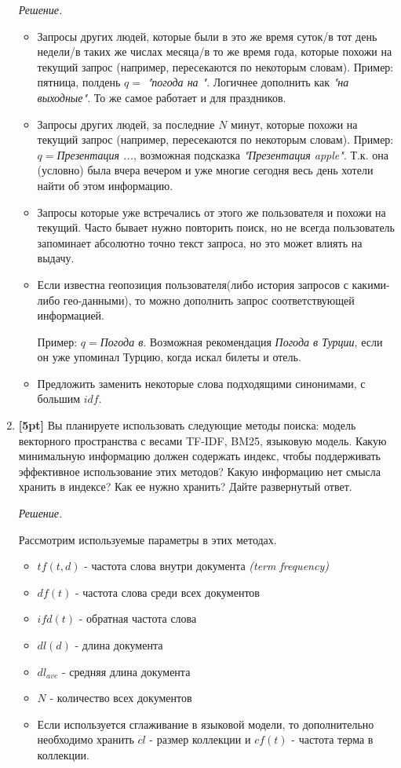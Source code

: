 \begin{enumerate}
	\textit{Решение.} 
	\begin{itemize}
		\item Запросы других людей, которые были в это же время суток/в тот день недели/в таких 
		же числах месяца/в то же время года, которые похожи на текущий запрос (например, 
		пересекаются по некоторым словам). Пример: пятница, полдень $q=$ \textit{"погода на "}. 
		Логичнее дополнить как \textit{"на выходные"}. То же самое работает и для праздников.
		\item Запросы других людей, за последние $N$ минут, которые похожи на текущий запрос 
		(например, пересекаются по некоторым словам). Пример: $q=$\textit{Презентация ...}, 
		возможная подсказка \textit{"Презентация apple"}. Т.к. она (условно) была вчера вечером и 
		уже многие сегодня весь день хотели найти об этом информацию.
		\item Запросы которые уже встречались от этого же пользователя и похожи на текущий. Часто 
		бывает нужно повторить поиск, но не всегда пользователь запоминает абсолютно точно текст 
		запроса, но это может влиять на выдачу.
		\item Если известна геопозиция пользователя(либо история запросов с какими-либо 
		гео-данными), то можно дополнить запрос соответствующей информацией.
		
		Пример: $q=$\textit{Погода в}. Возможная рекомендация \textit{Погода в Турции}, если он уже 
		упоминал Турцию, когда искал билеты и отель.
		\item Предложить заменить некоторые слова подходящими синонимами, с большим $idf$.
	\end{itemize}
	\item \textbf{[5pt]} Вы планируете использовать следующие методы поиска: модель векторного 
	пространства с весами TF-IDF, BM25, языковую модель. Какую минимальную информацию должен 
	содержать индекс, чтобы поддерживать эффективное использование этих методов? Какую информацию 
	нет смысла хранить в индексе? Как ее нужно хранить? Дайте развернутый ответ.
	
	\textit{Решение.}
	
	Рассмотрим используемые параметры в этих методах.
	\begin{itemize}
		\item $tf(t, d)$ - частота слова внутри документа \textit{(term frequency)}
		\item $df(t)$ - частота слова среди всех документов
		\item $ifd(t)$ - обратная частота слова
		\item $dl(d)$ - длина документа
		\item $dl_{ave}$ - средняя длина документа
		\item $N$ - количество всех документов
		\item Если используется сглаживание в языковой модели, то дополнительно необходимо хранить $cl$ - размер коллекции и $cf(t)$ - частота терма в коллекции.
	\end{itemize}
	

\end{enumerate}
